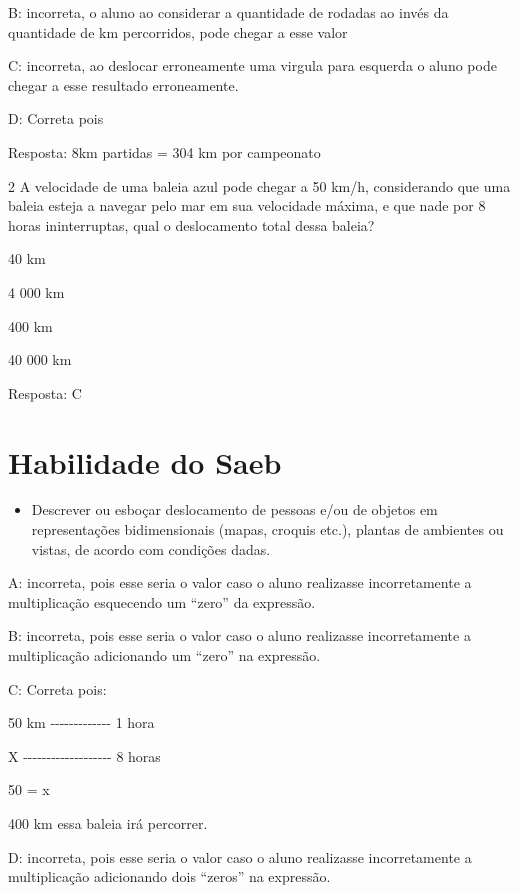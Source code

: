 B: incorreta, o aluno ao considerar a quantidade de rodadas ao invés da
quantidade de km percorridos, pode chegar a esse valor

C: incorreta, ao deslocar erroneamente uma virgula para esquerda o aluno
pode chegar a esse resultado erroneamente.

D: Correta pois

Resposta: 8km partidas = 304 km por campeonato

\num{2} A velocidade de uma baleia azul pode chegar a 50 km/h, considerando
que uma baleia esteja a navegar pelo mar em sua velocidade máxima, e que
nade por 8 horas ininterruptas, qual o deslocamento total dessa baleia?

\item 40 km
\item 4 000 km
\item 400 km
\item 40 000 km

Resposta: C

\section{Habilidade do Saeb}

\begin{itemize}
\tightlist

\item 
  Descrever ou esboçar deslocamento de pessoas e/ou de objetos em
  representações bidimensionais (mapas, croquis etc.), plantas de
  ambientes ou vistas, de acordo com condições dadas.
\end{itemize}

A: incorreta, pois esse seria o valor caso o aluno realizasse
incorretamente a multiplicação esquecendo um ``zero'' da expressão.

B: incorreta, pois esse seria o valor caso o aluno realizasse
incorretamente a multiplicação adicionando um ``zero'' na expressão.

C: Correta pois:

50 km -\/-\/-\/-\/-\/-\/-\/-\/-\/-\/-\/-\/- 1 hora

X -\/-\/-\/-\/-\/-\/-\/-\/-\/-\/-\/-\/-\/-\/-\/-\/-\/-\/- 8 horas

50 = x

400 km essa baleia irá percorrer.

D: incorreta, pois esse seria o valor caso o aluno realizasse
incorretamente a multiplicação adicionando dois ``zeros'' na expressão.

